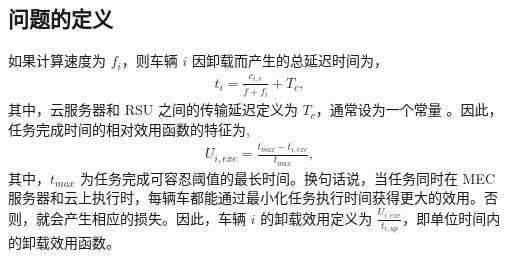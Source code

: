 \subsection{问题的定义}\label{section3-2-3}

如果计算速度为 $f_i$，则车辆 $i$ 因卸载而产生的总延迟时间为，
\begin{eqnarray}\label{E9}
 t_i=\frac{c_{i,e}}{\bar{f}+f_i}+T_c,
\end{eqnarray}
其中，云服务器和 RSU 之间的传输延迟定义为 $T_c$，通常设为一个常量 \cite{Xiao2020}。因此，任务完成时间的相对效用函数的特征为,
\begin{eqnarray}\label{E10}
U_{i,exe}=\frac{t_{max}-t_{i,exe}}{t_{max}},
\end{eqnarray}
其中，$t_{max}$ 为{任务完成可容忍阈值的最长时间}。换句话说，当任务同时在 MEC 服务器和云上执行时，每辆车都能通过最小化任务执行时间获得更大的效用。否则，就会产生相应的损失。因此，车辆 $i$ 的卸载效用定义为 $\frac{U_{i,exe}}{t_{i,up}}$，即单位时间内的卸载效用函数。


